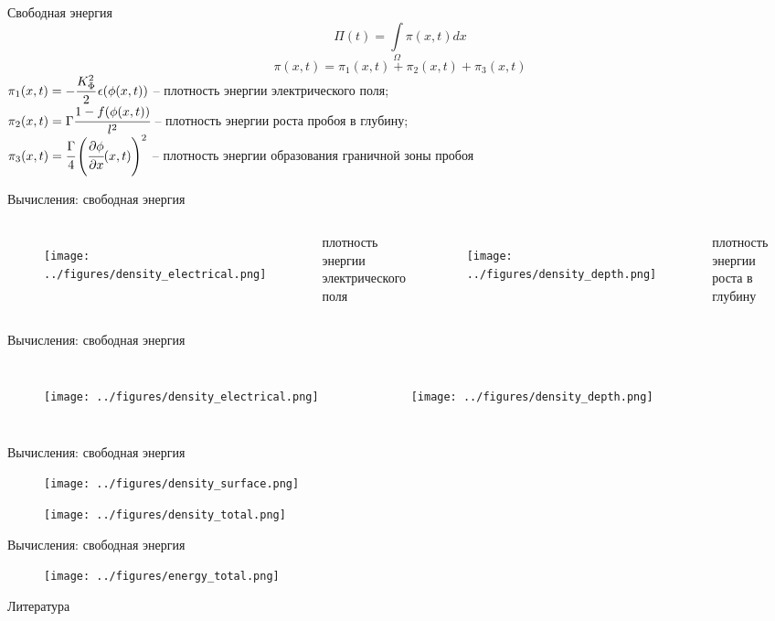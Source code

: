 \documentclass{beamer}
\begin{document}
\begin{frame}{Свободная энергия}
$$\Pi(t) = \int\limits_\Omega \pi(x, t) dx$$
$$\pi(x, t) = \pi_1(x, t) + \pi_2(x, t) + \pi_3(x, t)$$
$\pi_1(x, t) = -\cfrac{K_\Phi^2}{2} \, \epsilon(\phi(x, t))$ -- плотность энергии электрического
поля; \\
$\pi_2(x, t) = \Gamma \cfrac{1 - f(\phi(x, t))}{l^2}$ -- плотность энергии роста пробоя
в глубину; \\
$\pi_3(x, t) = \cfrac{\Gamma}{4} \left( \cfrac{\partial \phi}{\partial x}(x, t) \right)^2$ --
плотность энергии образования граничной зоны пробоя
\end{frame}


\begin{frame}{Вычисления: свободная энергия}
\begin{columns}
\begin{figure}
	\texttt{[image: ../figures/density\_electrical.png]}
\end{figure}
\begin{center}
	плотность энергии \\
	электрического поля
\end{center}
\begin{figure}
	\texttt{[image: ../figures/density\_depth.png]}
\end{figure}
\begin{center}
	плотность энергии \\
	роста в глубину
\end{center}
\end{columns}
\end{frame}


\begin{frame}{Вычисления: свободная энергия}
\begin{columns}
\begin{figure}
	\texttt{[image: ../figures/density\_electrical.png]}
\end{figure}
\begin{figure}
	\texttt{[image: ../figures/density\_depth.png]}
\end{figure}
\end{columns}
\end{frame}


\begin{frame}{Вычисления: свободная энергия}
\vspace{-0.3cm}
\begin{figure}
	\texttt{[image: ../figures/density\_surface.png]}
\end{figure}
\vspace{-0.4cm}
\begin{figure}
	\texttt{[image: ../figures/density\_total.png]}
\end{figure}
\end{frame}


\begin{frame}{Вычисления: свободная энергия}
\begin{figure}
	\texttt{[image: ../figures/energy\_total.png]}
\end{figure}
\end{frame}


\begin{frame}{Литература}
\printbibliography
\end{frame}
\end{document}
